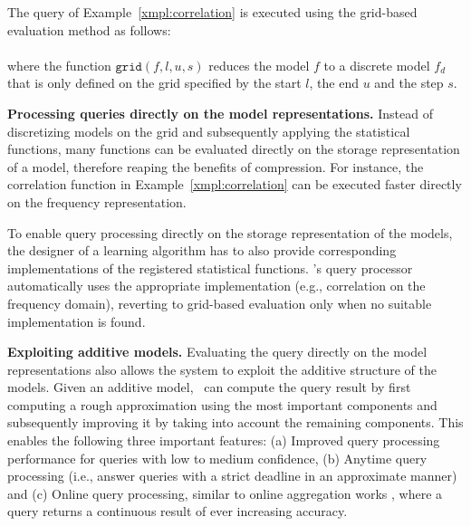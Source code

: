 \begin{example}
The query of Example~\ref{xmpl:correlation} is executed using the grid-based evaluation method as follows:\\

\\

\noindent where the function $\texttt{grid}(f, l, u, s)$ reduces the model $f$ to a discrete model $f_d$ that is only defined on the grid specified by the start $l$, the end $u$ and the step $s$.
\end{example}


\textbf{Processing queries directly on the model representations.}
Instead of discretizing models on the grid and subsequently applying the statistical functions, many functions can be evaluated directly on the storage representation of a model, therefore reaping the benefits of compression. For instance, the correlation function in Example~\ref{xmpl:correlation} can be executed faster directly on the frequency representation.%

To enable query processing directly on the storage representation of the models, the designer of a learning algorithm has to also provide corresponding implementations of the registered statistical functions. \projName's query processor automatically uses the appropriate implementation (e.g., correlation on the frequency domain), reverting to grid-based evaluation only when no suitable implementation is found.\\


{\bf Exploiting additive models.} Evaluating the query directly on the model representations also allows the system to exploit the additive structure of the models. Given an additive model, \projName\ can compute the query result by first computing a rough approximation using the most important components and subsequently improving it by taking into account the remaining components. This enables the following three important features: (a) Improved query processing performance for queries with low to medium confidence, (b) Anytime query processing (i.e., answer queries with a strict deadline in an approximate manner) and (c) Online query processing, similar to online aggregation works \cite{onlineaggr}, where a query returns a continuous result of ever increasing accuracy.

